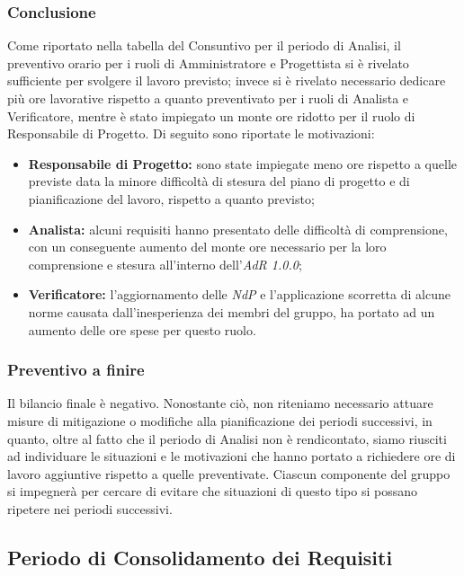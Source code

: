 	\subsubsection{Conclusione}
		Come riportato nella tabella del Consuntivo per il periodo di Analisi, il preventivo orario per i ruoli di Amministratore e Progettista si è rivelato sufficiente per svolgere il lavoro previsto; invece si è rivelato necessario dedicare più ore lavorative rispetto a quanto preventivato per i ruoli di Analista e Verificatore, mentre è stato impiegato un monte ore ridotto per il ruolo di Responsabile di Progetto. Di seguito sono riportate le motivazioni:
		\begin{itemize}
			\item \textbf{Responsabile di Progetto:} sono state impiegate meno ore rispetto a quelle previste data la minore difficoltà di stesura del piano di progetto e di pianificazione del lavoro, rispetto a quanto previsto;
			\item \textbf{Analista:} alcuni requisiti hanno presentato delle difficoltà di comprensione, con un conseguente aumento del monte ore necessario per la loro comprensione e stesura all'interno dell'\textit{AdR{} 1.0.0};
			\item \textbf{Verificatore:} l'aggiornamento delle \textit{NdP{}} e l'applicazione scorretta di alcune norme causata dall'inesperienza dei membri del gruppo, ha portato ad un aumento delle ore spese per questo ruolo.
		\end{itemize}

	\subsubsection{Preventivo a finire}
	Il bilancio finale è negativo. Nonostante ciò, non riteniamo necessario attuare misure di mitigazione o modifiche alla pianificazione dei periodi successivi, in quanto, oltre al fatto che il periodo di Analisi non è rendicontato, siamo riusciti ad individuare le situazioni e le motivazioni che hanno portato a richiedere ore di lavoro aggiuntive rispetto a quelle preventivate. Ciascun componente del gruppo si impegnerà per cercare di evitare che situazioni di questo tipo si possano ripetere nei periodi successivi.

\subsection{Periodo di Consolidamento dei Requisiti}
